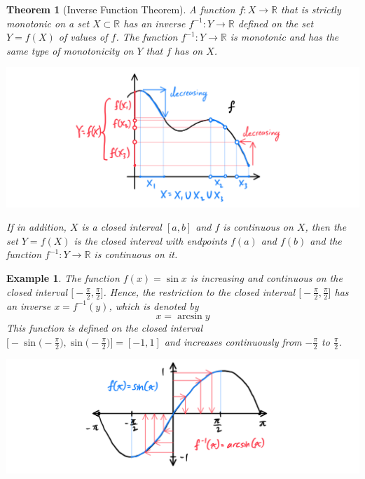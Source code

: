 \documentclass{article}
\newtheorem{theorem}{Theorem}[section]
\newtheorem{example}{Example}[section]
\theoremstyle{remark}
\theoremstyle{definition}
\begin{document}
\begin{theorem}[Inverse Function Theorem]
A function $f: X \longrightarrow \mathbb{R}$ that is strictly monotonic on a set $X \subset \mathbb{R}$ has an inverse $f^{-1}: Y \longrightarrow \mathbb{R}$ defined on the set $Y = f(X)$ of values of $f$. The function $f^{-1}: Y \longrightarrow \mathbb{R}$ is monotonic and has the same type of monotonicity on $Y$ that $f$ has on $X$. 
\begin{center}
    \includegraphics[scale=0.33]{img/Inverse_Function_Theorem_Analysis.PNG}
\end{center}
If in addition, $X$ is a closed interval $[a,b]$ and $f$ is continuous on $X$, then the set $Y = f(X)$ is the closed interval with endpoints $f(a)$ and $f(b)$ and the function $f^{-1}: Y \longrightarrow \mathbb{R}$ is continuous on it.
\end{theorem}

\begin{example}
The function $f(x) = \sin{x}$ is increasing and continuous on the closed interval $\big[ -\frac{\pi}{2}, \frac{\pi}{2} \big]$. Hence, the restriction to the closed interval $\big[ -\frac{\pi}{2}, \frac{\pi}{2} \big]$ has an inverse $x = f^{-1}(y)$, which is denoted by 
\[x = \arcsin{y}\]
This function is defined on the closed interval $\big[- \sin\big(-\frac{\pi}{2}\big), \sin\big(-\frac{\pi}{2}\big) \big] = [-1,1]$ and increases continuously from $-\frac{\pi}{2}$ to $\frac{\pi}{2}$. 
\begin{center}
    \includegraphics[scale=0.3]{img/Inverse_Function_Theorem_Sin.PNG}
\end{center}
\end{example}
\end{document}
